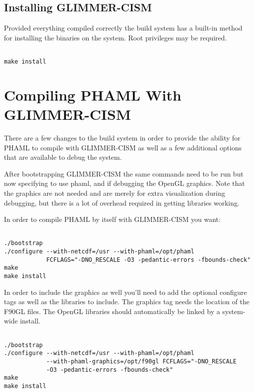 \subsection{Installing GLIMMER-CISM}
Provided everything compiled correctly the build system has a built-in method for installing the binaries on the system.  Root privileges may be required. 
\begin{framecode}{6in}
\begin{verbatim}

make install

\end{verbatim}
\end{framecode}
\section{Compiling PHAML With GLIMMER-CISM}
There are a few changes to the build system in order to provide the ability for PHAML to compile with GLIMMER-CISM as well as a few additional options that are available to debug the system.

After bootstrapping GLIMMER-CISM the same commands need to be run but now specifying to use phaml, and if debugging the OpenGL graphics.  Note that the graphics are not needed and are merely for extra visualization during debugging, but there is a lot of overhead required in getting libraries working. 

In order to compile PHAML by itself with GLIMMER-CISM you want:
\begin{framecode}{6in}
\begin{verbatim}

./bootstrap 
./configure --with-netcdf=/usr --with-phaml=/opt/phaml 
            FCFLAGS="-DNO_RESCALE -O3 -pedantic-errors -fbounds-check"
make  
make install

\end{verbatim}
\end{framecode}

In order to include the graphics as well you'll need to add the optional configure tags as well as the libraries to include.  The graphics tag needs the location of the F90GL files.  The OpenGL libraries should automatically be linked by a system-wide install.

\begin{framecode}{6in}
\begin{verbatim}

./bootstrap 
./configure --with-netcdf=/usr --with-phaml=/opt/phaml 
            --with-phaml-graphics=/opt/f90gl FCFLAGS="-DNO_RESCALE 
            -O3 -pedantic-errors -fbounds-check" 
make 
make install

\end{verbatim}
\end{framecode}

